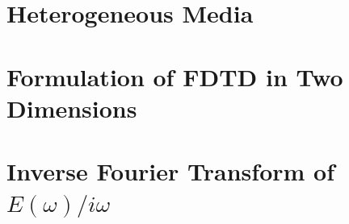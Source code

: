 \documentclass[12pt,twocolumn]{article}
\begin{document}
\cite{Sacks95}\cite{Schneider10}

\section{Heterogeneous Media}

\section{Formulation of FDTD in Two Dimensions}





\newpage
\onecolumn
\appendix
\section{Inverse Fourier Transform of $E(\omega)/i\omega$}
\label{ap:fourier}
\end{document}
